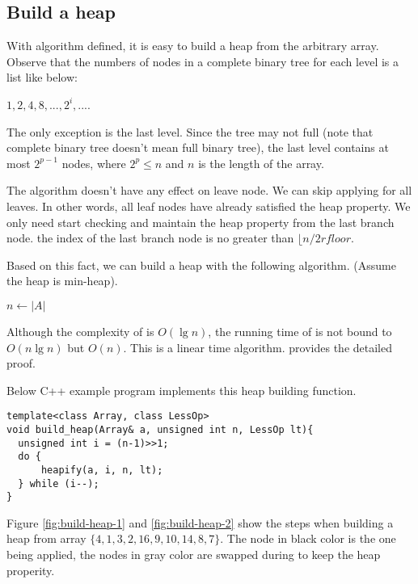 \documentclass{article}
\begin{document}
\subsection{Build a heap}

With  algorithm defined, it is easy to build a heap from the arbitrary
array. Observe that the numbers of nodes in a complete binary tree
for each level is a list like below:

$1, 2, 4, 8, ..., 2^i, ...$.

The only exception is the last level. Since the tree may not full
(note that complete binary tree doesn't mean full binary tree), the
last level contains at most $2^{p-1}$ nodes, where $2^p \leq n$ and $n$
is the length of the array.

The  algorithm doesn't have any effect on leave node.
We can skip applying  for all leaves. In other words,
all leaf nodes have already satisfied the heap property. We only need
start checking and maintain the heap property from the last branch node.
the index of the last branch node is no greater than $\lfloor n/2 rfloor$.

Based on this fact, we can build a heap with the following algorithm.
(Assume the heap is min-heap).

\begin{algorithmic}[1]
  \State $n \gets |A|$
    \State {}
  \EndFor
\EndFunction
\end{algorithmic}

Although the complexity of  is $O(\lg n)$, the running time
of  is not bound to $O(n \lg n)$ but $O(n)$. This
is a linear time algorithm. \cite{CLRS} provides the detailed proof.

Below C++ example program implements this heap building function.

\lstset{language=C++}
\begin{lstlisting}
template<class Array, class LessOp>
void build_heap(Array& a, unsigned int n, LessOp lt){
  unsigned int i = (n-1)>>1;
  do {
      heapify(a, i, n, lt);
  } while (i--);
}
\end{lstlisting}

Figure \ref{fig:build-heap-1} and \ref{fig:build-heap-2}
show the steps when building a heap from
array $\{4, 1, 3, 2, 16, 9, 10, 14, 8, 7\}$.
The node in black color is the one  being
applied, the nodes in gray color are swapped during
to keep the heap properity.
\end{document}
